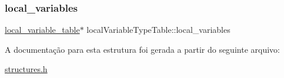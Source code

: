 \subsubsection{\texorpdfstring{local\+\_\+variables}{local\_variables}}
{\footnotesize\ttfamily \hyperlink{structlocal__variable__table}{local\+\_\+variable\+\_\+table}$\ast$ local\+Variable\+Type\+Table\+::local\+\_\+variables}



A documentação para esta estrutura foi gerada a partir do seguinte arquivo\+:\begin{DoxyCompactItemize}
\item 
\hyperlink{structures_8h}{structures.\+h}\end{DoxyCompactItemize}
